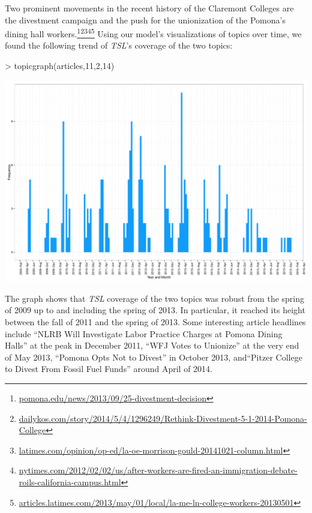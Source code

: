 \documentclass[a4paper]{article}
\begin{document}
Two prominent movements in the recent history of the Claremont Colleges are the divestment campaign and the push for the unionization of the Pomona's dining hall workers.\footnote{\href{http://www.pomona.edu/news/2013/09/25-divestment-decision}{pomona.edu/news/2013/09/25-divestment-decision}}\footnote{\href{http://www.dailykos.com/story/2014/5/4/1296249/Rethink-Divestment-5-1-2014-Pomona-College}{dailykos.com/story/2014/5/4/1296249/Rethink-Divestment-5-1-2014-Pomona-College}}\footnote{\href{http://www.latimes.com/opinion/op-ed/la-oe-morrison-gould-20141021-column.html}{latimes.com/opinion/op-ed/la-oe-morrison-gould-20141021-column.html}}\footnote{\href{http://www.nytimes.com/2012/02/02/us/after-workers-are-fired-an-immigration-debate-roils-california-campus.html?_r=0}{nytimes.com/2012/02/02/us/after-workers-are-fired-an-immigration-debate-roils-california-campus.html}}\footnote{\href{http://articles.latimes.com/2013/may/01/local/la-me-ln-college-workers-20130501}{articles.latimes.com/2013/may/01/local/la-me-ln-college-workers-20130501}} Using our model's visualizations of topics over time, we found the following trend of \textit{TSL}'s coverage of the two topics:

\begin{Schunk}
\begin{Sinput}
> topicgraph(articles,11,2,14)
\end{Sinput}
\end{Schunk}
\includegraphics{FinalProject-007}

The graph shows that \textit{TSL} coverage of the two topics was robust from the spring of 2009 up to and including the spring of 2013. In particular, it reached its height between the fall of 2011 and the spring of 2013. Some interesting article headlines include ``NLRB Will Investigate Labor Practice Charges at Pomona Dining Halls'' at the peak in December 2011, ``WFJ Votes to Unionize'' at the very end of May 2013, ``Pomona Opts Not to Divest'' in October 2013, and``Pitzer College to Divest From Fossil Fuel Funds'' around April of 2014.
\end{document}
